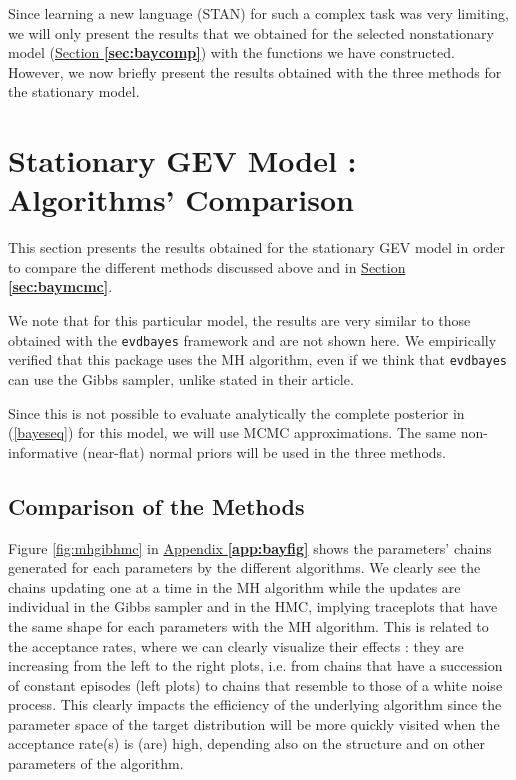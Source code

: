 Since learning a new language (STAN) for such a complex task was very limiting, we will only present the results that we obtained for the selected nonstationary model (\hyperref[sec:baycomp]{Section \textbf{\ref{sec:baycomp}}}) with the functions we have constructed. However, we now briefly present the results obtained with the three methods for the stationary model. 


\section{Stationary GEV Model : Algorithms' Comparison}\label{sec:baystatio}


This section presents the results obtained for the stationary GEV model in order to compare the different methods discussed above and in \hyperref[sec:baymcmc]{Section \textbf{\ref{sec:baymcmc}}}. 

We note that for this particular model, the results are very similar to those obtained with the \texttt{evdbayes} framework and are not shown here. We empirically verified that this package uses the MH algorithm, even if we think that  \texttt{evdbayes} can use the Gibbs sampler, unlike \citet[pp.6]{hartmann_bayesian_2016} stated in their article.

Since this is not possible to evaluate analytically the complete posterior in (\ref{bayeseq}) for this model, we will use MCMC approximations. The same non-informative (near-flat) normal priors will be used
in the three methods.

\subsection{Comparison of the Methods}


Figure \ref{fig:mhgibhmc} in \hyperref[app:bayfig]{Appendix \textbf{\ref{app:bayfig}}}
shows the parameters' chains generated for each parameters by the different algorithms. 
We clearly see the chains updating one at a time in the MH algorithm while the updates are individual in the Gibbs sampler and in the HMC, implying traceplots that have the same shape for each parameters with the MH algorithm. This is related to the acceptance rates, where we can clearly visualize their effects : they are increasing from the left to the right plots, i.e. from chains that have a succession of constant episodes (left plots) to chains that resemble to those of a white noise process.
This clearly impacts the efficiency of the underlying algorithm since the parameter space of the target distribution will be more quickly visited when the acceptance rate(s) is (are) high, depending also on the structure and on other parameters of the algorithm. 


